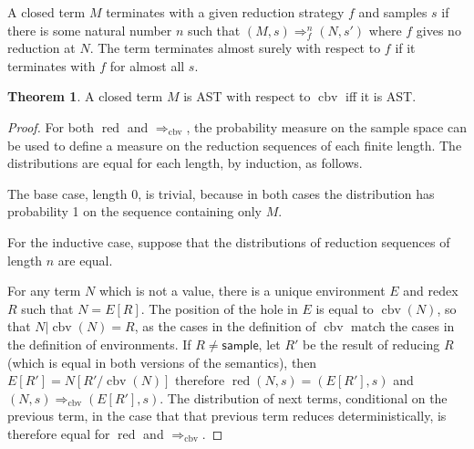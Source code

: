 \documentclass{article}
\newcommand{\tsample}{\mathsf{sample}}
\DeclareMathOperator{\red}{red}
\DeclareMathOperator{\cbv}{cbv}
\theoremstyle{definition}
\theoremstyle{lemma}
\newtheorem{theorem}{Theorem}
\theoremstyle{remark}
\begin{document}
A closed term $M$ terminates with a given reduction strategy $f$ and samples $s$ if there is some natural number $n$ such that $(M,s) \Rightarrow_f^n (N,s')$ where $f$ gives no reduction at $N$. The term terminates almost surely with respect to $f$ if it terminates with $f$ for almost all $s$.

\begin{theorem} \label{thm:AstEquivalence}
A closed term $M$ is AST with respect to $\cbv$ iff it is AST.
\end{theorem}
\begin{proof}

For both $\red$ and $\Rightarrow_{\cbv}$, the probability measure on the sample space can be used to define a measure on the reduction sequences of each finite length. The distributions are equal for each length, by induction, as follows.

The base case, length 0, is trivial, because in both cases the distribution has probability 1 on the sequence containing only $M$.

For the inductive case, suppose that the distributions of reduction sequences of length $n$ are equal. 

For any term $N$ which is not a value, there is a unique environment $E$ and redex $R$ such that $N = E[R]$. The position of the hole in $E$ is equal to $\cbv(N)$, so that $N|\cbv(N) = R$, as the cases in the definition of $\cbv$ match the cases in the definition of environments. If $R \neq \tsample$, let $R'$ be the result of reducing $R$ (which is equal in both versions of the semantics), then $E[R'] = N[R' / \cbv(N)]$ therefore $\red(N,s) = (E[R'],s)$ and $(N,s) \Rightarrow_{\cbv} (E[R'],s)$. The distribution of next terms, conditional on the previous term, in the case that that previous term reduces deterministically, is therefore equal for $\red$ and $\Rightarrow_{\cbv}$.


\end{proof}
\end{document}
